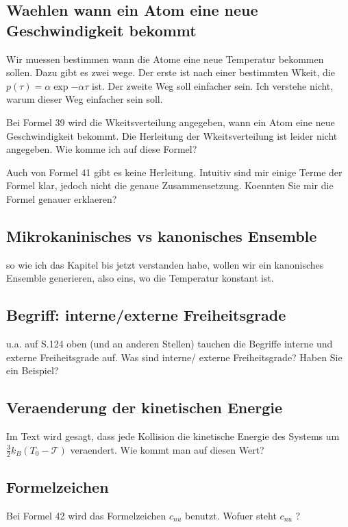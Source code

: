 \documentclass[]{article}
\begin{document}
\subsection{Waehlen wann ein Atom eine neue Geschwindigkeit bekommt}
Wir muessen bestimmen wann die Atome eine neue Temperatur bekommen sollen. Dazu gibt es zwei wege. Der erste ist nach einer bestimmten Wkeit, die $p(\tau)= \alpha \exp{- \alpha \tau}$ ist. Der zweite Weg soll einfacher sein. Ich verstehe nicht, warum dieser Weg einfacher sein soll. 

Bei Formel 39 wird die Wkeitsverteilung angegeben, wann ein Atom eine neue Geschwindigkeit bekommt. Die Herleitung der Wkeitsverteilung ist leider nicht angegeben. Wie komme ich auf diese Formel? 

Auch von Formel 41 gibt es keine Herleitung. Intuitiv sind mir einige Terme der Formel klar, jedoch nicht die genaue Zusammensetzung. Koennten Sie mir die Formel genauer erklaeren? 

\subsection{Mikrokaninisches vs kanonisches Ensemble}
so wie ich das Kapitel bis jetzt verstanden habe, wollen wir ein kanonisches Ensemble generieren, also eins, wo die Temperatur konstant ist. 


\subsection{Begriff: interne/externe Freiheitsgrade}
u.a. auf S.124 oben (und an anderen Stellen) tauchen die Begriffe interne und externe Freiheitsgrade auf. Was sind interne/ externe Freiheitsgrade? Haben Sie ein Beispiel?  

\subsection{Veraenderung der kinetischen Energie}
Im Text wird gesagt, dass jede Kollision die kinetische Energie des Systems um $\frac{3}{2} k_B (T_0-\mathcal{T})$ veraendert. Wie kommt man auf diesen Wert? 

\subsection{Formelzeichen}
Bei Formel 42 wird das Formelzeichen $c_{nu}$ benutzt. Wofuer steht $c_{nu}$ ?
\end{document}
